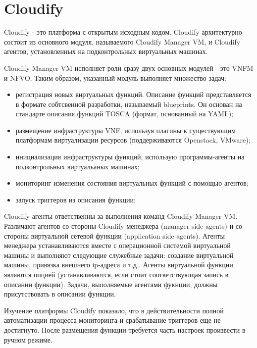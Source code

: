 \documentclass[oneside,final,14pt,a4paper]{extreport}
\begin{document}
\section{Cloudify}
Cloudify - это платформа с открытым исходным кодом. Cloudify архитектурно состоит из основного модуля, называемого Cloudify Manager VM, и Cloudify агентов, установленных на подконтрольных виртуальных машинах. 

Cloudify Manager VM исполняет роли сразу двух основных модулей - это VNFM и NFVO. Таким образом, указанный модуль выполняет множество задач:
\begin{itemize}
	\item регистрация новых виртуальных функций. Описание функций представляется в формате собтсвенной разработки, называемый blueprints. Он основан на стандарте описания функций TOSCA (формат, основанный на YAML);
	\item размещение инфраструктуры VNF, используя плагины к существующим платформам виртуализации ресурсов (поддерживаются Openstack, VMware);
	\item инициализация инфраструктуры функций, использую программы-агенты на подконтрольных виртуальаных машинах;
	\item мониторинг изменения состояния виртуальных функций с помощью агентов;
	\item запуск триггеров из описания функции;
\end{itemize}

Cloudify агенты ответственны за выполнения команд Cloudify Manager VM. Различают агентов со стороны Cloudify менеджера (manager side agents) и со стороны виртуальной сетевой функции (application side agents). Агенты менеджера устанавливаются вместе с операционной системой виртуальной машины и выполняют следующие служебные задачи: создание виртуальной машины, привязка внешнего ip-адреса и т.д.. Агенты виртуальной функции являются опцией (устанавливаются, если стоит соответствующая запись в описании функции). Задачи, выполняемые агентами фукнции, должны присутствовать в описании функции.\cite{cloudify-official-oveview1}

Изучение платформы Cloudify показало, что в действительности полной автоматизации процесса мониторинга и срабатывание триггеров еще не достигнуто. После размещения функции требуется часть настроек произвести в ручном режиме. 
\end{document}
